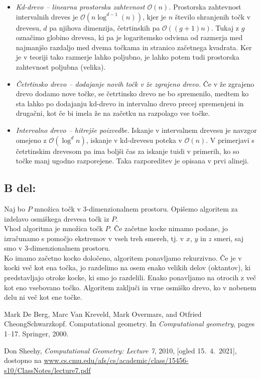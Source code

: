 \documentclass[a4paper,11pt]{article}
\begin{document}
\begin{itemize}
    \item \textit{Kd-drevo -- linearna prostorska zahtevnost $\mathcal{O}(n)$.} Prostorska zahtevnost intervalnih dreves je $\mathcal{O}(n \log^{d - 1}(n))$, kjer je $n$ število shranjenih točk v drevesu, $d$ pa njihova dimenzija, četrtinskih pa $\mathcal{O}((g + 1) n)$. Tukaj z $g$ označimo globino drevesa, ki pa je logaritemsko odvisna od razmerja med najmanjšo razdaljo med dvema točkama in stranico začetnega kvadrata. Ker je v teoriji tako razmerje lahko poljubno, je lahko potem tudi prostorska zahtevnost poljubna (velika). 
    \item \textit{Četrtinsko drevo -- dodajanje novih točk v že zgrajeno drevo.} Če v že zgrajeno drevo dodamo nove točke, se četrtinsko drevo ne bo spremenilo, medtem ko sta lahko po dodajanju kd-drevo in intervalno drevo precej spremenjeni in drugačni, kot če bi imela že na začetku na razpolago vse točke.
    \item \textit{Intervalno drevo -- hitrejše poizvedbe.} Iskanje v intervalnem drevesu je navzgor omejeno z $\mathcal{O}(\log^d n)$, iskanje v kd-drevesu poteka v $\mathcal{O}(n)$. V primerjavi s četrtinskim drevesom pa ima boljši čas za iskanje tuidi v primerih, ko so točke manj ugodno razporejene. Taka razporeditev je opisana v prvi alineji.
\end{itemize}
    
\subsection*{B del:}
Naj bo $P$ množica točk v $3$-dimenzionalnem prostoru. Opišemo algoritem za izdelavo osmiškega drevesa točk iz $P$.
\\
Vhod algoritma je množica točk $P$. Če začetne kocke nimamo podane, jo izračunamo s pomočjo ekstremov v vseh treh smereh, tj. v $x$, $y$ in $z$ smeri, saj smo v $3$-dimenzionalnem prostoru.
\\
Ko imamo začetno kocko določeno, algoritem ponavljamo rekurzivno. 
Če je v kocki več kot ena točka, jo razdelimo na osem enako velikih delov (oktantov), ki predstavljajo otroke kocke, ki smo jo razdelili.
Enako ponavljamo na otrocih z več kot eno vsebovano točko. Algoritem zaključi in vrne osmiško drevo, ko v nobenem delu ni več kot ene točke. 






\newpage
\begin{thebibliography}{99}
    Mark De Berg, Marc Van Kreveld, Mark Overmars, and Otfried CheongSchwarzkopf.    Computational  geometry.    In \emph{Computational  geometry}, pages 1–17. Springer, 2000.

    Don Sheehy, \emph{Computational Geometry: Lecture 7}, 2010, [ogled 15.~4.~2021], dostopno na
    \url{www.cs.cmu.edu/afs/cs/academic/class/15456-s10/ClassNotes/lecture7.pdf}

\end{thebibliography}
    
\end{document}
